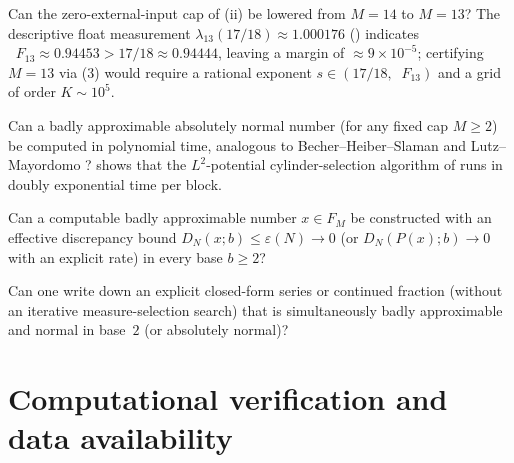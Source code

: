 \documentclass[11pt]{article}
\DeclareMathOperator{\dimH}{\dim_{\mathrm{H}}}
\begin{document}
\begin{question}[The elementary gap $M=13$]\label{q:m13}
Can the zero-external-input cap of \textup{(ii)} be lowered from $M=14$ to $M=13$? The descriptive float measurement $\lambda_{13}(17/18)\approx1.000176$ () indicates $\dimH F_{13}\approx0.94453>17/18\approx0.94444$, leaving a margin of $\approx9\times10^{-5}$; certifying $M=13$ via (3) would require a rational exponent $s\in(17/18,\dimH F_{13})$ and a grid of order $K\sim10^5$.
\end{question}

\begin{question}\label{q:polytime}
Can a badly approximable absolutely normal number (for any fixed cap $M\ge2$) be computed in polynomial time, analogous to Becher--Heiber--Slaman \cite{BecherHeiberSlaman2013} and Lutz--Mayordomo \cite{LutzMayordomo2021}?  shows that the $L^2$-potential cylinder-selection algorithm of  runs in doubly exponential time per block.
\end{question}

\begin{question}\label{q:rates}
Can a computable badly approximable number $x\in F_M$ be constructed with an effective discrepancy bound $D_N(x;b)\le\varepsilon(N)\to0$ (or $D_N(P(x);b)\to0$ with an explicit rate) in every base $b\ge2$?
\end{question}

\begin{question}\label{q:closedform}
Can one write down an explicit closed-form series or continued fraction (without an iterative measure-selection search) that is simultaneously badly approximable and normal in base~$2$ (or absolutely normal)?
\end{question}

\section{Computational verification and data availability}\label{sec:verification}
\end{document}
